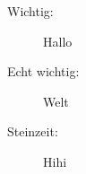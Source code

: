 \begin{description}
    \item[Wichtig:] Hallo
    \item[Echt wichtig:] Welt
    \item[Steinzeit:] Hihi
\end{description}

